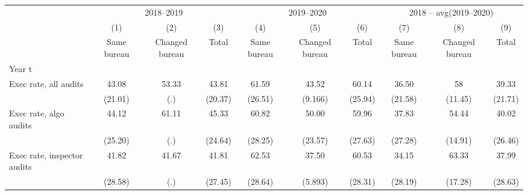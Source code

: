 {
\def\sym#1{\ifmmode^{#1}\else\(^{#1}\)\fi}
\begin{tabular}{l*{9}{c}}
\toprule
            &\multicolumn{3}{c}{2018–2019}                                    &\multicolumn{3}{c}{2019–2020}                                    &\multicolumn{3}{c}{2018 – avg(2019–2020)}                        \\\cmidrule(lr){2-4}\cmidrule(lr){5-7}\cmidrule(lr){8-10}
            &\multicolumn{1}{c}{(1)}&\multicolumn{1}{c}{(2)}&\multicolumn{1}{c}{(3)}&\multicolumn{1}{c}{(4)}&\multicolumn{1}{c}{(5)}&\multicolumn{1}{c}{(6)}&\multicolumn{1}{c}{(7)}&\multicolumn{1}{c}{(8)}&\multicolumn{1}{c}{(9)}\\
            &\multicolumn{1}{c}{Same bureau}&\multicolumn{1}{c}{Changed bureau}&\multicolumn{1}{c}{Total}&\multicolumn{1}{c}{Same bureau}&\multicolumn{1}{c}{Changed bureau}&\multicolumn{1}{c}{Total}&\multicolumn{1}{c}{Same bureau}&\multicolumn{1}{c}{Changed bureau}&\multicolumn{1}{c}{Total}\\
\midrule
Year t      &                     &                     &                     &                     &                     &                     &                     &                     &                     \\
Exec rate, all audits&       43.08         &       53.33         &       43.81         &       61.59         &       43.52         &       60.14         &       36.50         &          58         &       39.33         \\
            &     (21.01)         &         (.)         &     (20.37)         &     (26.51)         &     (9.166)         &     (25.94)         &     (21.58)         &     (11.45)         &     (21.71)         \\
Exec rate, algo audits&       44.12         &       61.11         &       45.33         &       60.82         &       50.00         &       59.96         &       37.83         &       54.44         &       40.02         \\
            &     (25.20)         &         (.)         &     (24.64)         &     (28.25)         &     (23.57)         &     (27.63)         &     (27.28)         &     (14.91)         &     (26.46)         \\
Exec rate, inspector audits&       41.82         &       41.67         &       41.81         &       62.53         &       37.50         &       60.53         &       34.15         &       63.33         &       37.99         \\
            &     (28.58)         &         (.)         &     (27.45)         &     (28.64)         &     (5.893)         &     (28.31)         &     (28.19)         &     (17.28)         &     (28.63)         \\

\end{tabular}}
